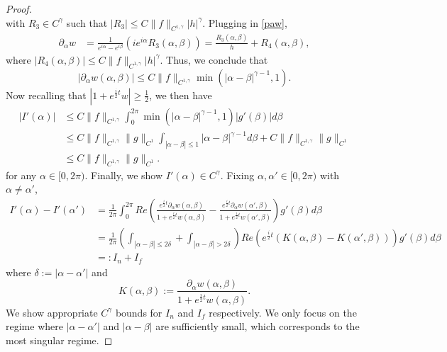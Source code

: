 \documentclass[11pt,reqno]{amsproc}
\newcommand{\p}{\partial}
\newcommand{\palpha}{\p_\alpha}
\begin{document}
\begin{proof}
$$    $$
    with $R_3 \in C^\gamma$ such that $|R_3| \le C\|f\|_{C^{1,\gamma}}|h|^\gamma$. Plugging in \eqref{paw},
    \begin{equation}
        \label{paw1}
        \begin{aligned}
            \palpha w &= \frac{1}{e^{i\alpha} - e^{i\beta}}\left(ie^{i\alpha} R_3(\alpha,\beta)\right) = \frac{R_3(\alpha,\beta)}{h} + R_4(\alpha,\beta),
        \end{aligned}
    \end{equation}
    where $|R_4(\alpha,\beta)| \le C\|f\|_{C^{1,\gamma}}|h|^\gamma$. Thus, we conclude that 
    \begin{equation}
        \label{est:paw}
        |\p_\alpha w(\alpha,\beta)| \le C\|f\|_{C^{1,\gamma}}\min(|\alpha - \beta|^{\gamma - 1}, 1).
    \end{equation}
    Now recalling that $|1 + e^{\frac{i}{2}t} w| \ge \frac12$, we then have
    \begin{equation}
        \label{est:logintegralC1}
        \begin{aligned}
        |I'(\alpha)| &\le C\|f\|_{C^{1,\gamma}}\int_0^{2\pi} \min(|\alpha - \beta|^{\gamma - 1}, 1) |g'(\beta)| d\beta \\
        &\le C\|f\|_{C^{1,\gamma}}\|g\|_{C^1}\int_{|\alpha - \beta| \le 1} |\alpha - \beta|^{\gamma - 1} d\beta + C\|f\|_{C^{1,\gamma}}\|g\|_{C^1}\\
        &\le C\|f\|_{C^{1,\gamma}}\|g\|_{C^1}.
        \end{aligned}
    \end{equation}
    for any $\alpha \in [0,2\pi)$.
    Finally, we show $I'(\alpha) \in C^\gamma$. Fixing $\alpha, \alpha' \in [0,2\pi)$ with $\alpha \neq \alpha'$, 
    \begin{equation}
        \label{eq:I'adiff}
        \begin{aligned}
        I'(\alpha) - I'(\alpha') &= \frac{1}{2\pi}\int_0^{2\pi}Re\left(\frac{e^{\frac{i}{2}t} \palpha w(\alpha,\beta)}{1+ e^{\frac{i}{2}t} w(\alpha,\beta)} - \frac{e^{\frac{i}{2}t} \palpha w(\alpha',\beta)}{1+ e^{\frac{i}{2}t} w(\alpha',\beta)}\right) g'(\beta) d\beta\\
        &=\frac{1}{2\pi}\left(\int_{|\alpha - \beta| \le 2\delta} + \int_{|\alpha - \beta| > 2\delta}\right)Re\left(e^{\frac{i}{2}t}(K(\alpha,\beta) - K(\alpha',\beta))\right) g'(\beta) d\beta\\
        &=: I_{n} + I_{f}
        \end{aligned}
    \end{equation}
    where $\delta := |\alpha - \alpha'|$ and
    $$
    K(\alpha,\beta) := \frac{\palpha w(\alpha,\beta)}{1+ e^{\frac{i}{2}t} w(\alpha,\beta)}.
    $$
    We show appropriate $C^\gamma$ bounds for $I_n$ and $I_f$ respectively. We only focus on the regime where $|\alpha - \alpha'|$ and $|\alpha-\beta|$ are sufficiently small, which corresponds to the most singular regime.
    

\end{proof}
\end{document}
